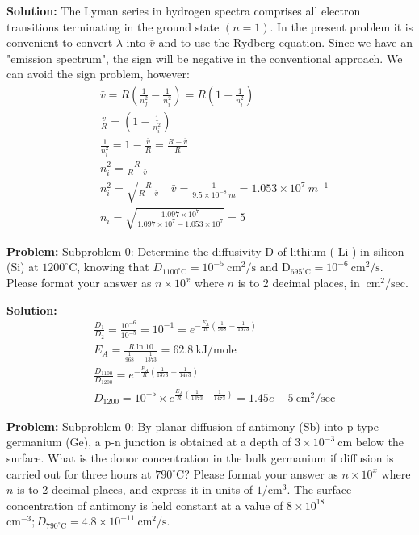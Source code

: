 \documentclass[10pt]{article}
\begin{document}
\textbf{Solution:}
The Lyman series in hydrogen spectra comprises all electron transitions terminating in the ground state $({n}=1)$. In the present problem it is convenient to convert $\lambda$ into $\bar{v}$ and to use the Rydberg equation. Since we have an "emission spectrum", the sign will be negative in the conventional approach. We can avoid the sign problem, however:
\[
\begin{aligned}
& \bar{v}=R\left(\frac{1}{n_{f}^{2}}-\frac{1}{n_{i}^{2}}\right)=R\left(1-\frac{1}{n_{i}^{2}}\right) \\
& \overline{\frac{v}{R}}=\left(1-\frac{1}{n_{i}^{2}}\right) \\
& \frac{1}{n_{i}^{2}}=1-\frac{\bar{v}}{R}=\frac{R-\bar{v}}{R} \\
& n_{i}^{2}=\frac{R}{R-\bar{v}} \\
& {n}_{{i}}^{2}=\sqrt{\frac{{R}}{{R}-\bar{v}}} \quad \bar{v}=\frac{1}{9.5 \times 10^{-8} {~m}}=1.053 \times 10^{7} {~m}^{-1} \\
& n_{i}=\sqrt{\frac{1.097 \times 10^{7}}{1.097 \times 10^{7}-1.053 \times 10^{7}}}= \boxed{5}
\end{aligned}
\]


\textbf{Problem:}
Subproblem 0: Determine the diffusivity $\mathrm{D}$ of lithium ( $\mathrm{Li}$ ) in silicon (Si) at $1200^{\circ} \mathrm{C}$, knowing that $D_{1100^{\circ} \mathrm{C}}=10^{-5} \mathrm{~cm}^{2} / \mathrm{s}$ and $\mathrm{D}_{695^{\circ} \mathrm{C}}=10^{-6} \mathrm{~cm}^{2} / \mathrm{s}$. Please format your answer as $n \times 10^x$ where $n$ is to 2 decimal places, in $\mathrm{~cm}^2/\mathrm{sec}$.


\textbf{Solution:}
\[
\begin{aligned}
&\frac{D_{1}}{D_{2}}=\frac{10^{-6}}{10^{-5}}=10^{-1}=e^{-\frac{E_{A}}{R}\left(\frac{1}{968}-\frac{1}{1373}\right)} \\
&E_{A}=\frac{R \ln 10}{\frac{1}{968}-\frac{1}{1373}}=62.8 \mathrm{~kJ} / \mathrm{mole} \\
&\frac{D_{1100}}{D_{1200}}=e^{-\frac{E_{A}}{R}\left(\frac{1}{1373}-\frac{1}{1473}\right)} \\
&D_{1200}=10^{-5} \times e^{\frac{E_{A}}{R}\left(\frac{1}{1373}-\frac{1}{1473}\right)}= \boxed{1.45e-5} \mathrm{~cm}^{2} / \mathrm{sec}
\end{aligned}
\]


\textbf{Problem:}
Subproblem 0: By planar diffusion of antimony (Sb) into p-type germanium (Ge), a p-n junction is obtained at a depth of $3 \times 10^{-3} \mathrm{~cm}$ below the surface. What is the donor concentration in the bulk germanium if diffusion is carried out for three hours at $790^{\circ} \mathrm{C}$? Please format your answer as $n \times 10^x$ where $n$ is to 2 decimal places, and express it in units of $1/\mathrm{cm}^3$. The surface concentration of antimony is held constant at a value of $8 \times 10^{18}$ $\mathrm{cm}^{-3} ; D_{790^{\circ} \mathrm{C}}=4.8 \times 10^{-11} \mathrm{~cm}^{2} / \mathrm{s}$.
\end{document}
